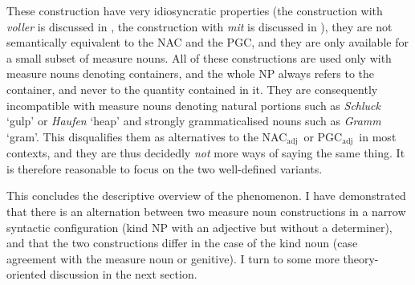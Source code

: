 \documentclass[USenglish]{article}
\newcommand{\Sub}[1]{\ensuremath{\mathrm{_{#1}}}}
\newcommand{\NACa}{NAC\Sub{adj}}
\newcommand{\PGCa}{PGC\Sub{adj}}
\begin{document}
\begin{exe}
  \ex\label{ex:alternatives}
  \begin{xlist}
  \end{xlist}
\end{exe}

These construction have very idiosyncratic properties (the construction with \textit{voller} is discussed in \citealp{Zeldes2018}, the construction with \textit{mit} is discussed in \citealp{Bhatt1990}), they are not semantically equivalent to the NAC and the PGC, and they are only available for a small subset of measure nouns.
All of these constructions are used only with measure nouns denoting containers, and the whole NP always refers to the container, and never to the quantity contained in it.
They are consequently incompatible with measure nouns denoting natural portions such as \textit{Schluck} `gulp' or \textit{Haufen} `heap' and strongly grammaticalised nouns such as \textit{Gramm} `gram'.
This disqualifies them as alternatives to the \NACa\ or \PGCa\ in most contexts, and they are thus decidedly \textit{not} more ways of saying the same thing. 
It is therefore reasonable to focus on the two well-defined variants.

This concludes the descriptive overview of the phenomenon.
I have demonstrated that there is an alternation between two measure noun constructions in a narrow syntactic configuration (kind NP with an adjective but without a determiner), and that the two constructions differ in the case of the kind noun (case agreement with the measure noun or genitive).
I turn to some more theory-oriented discussion in the next section.


\end{document}
